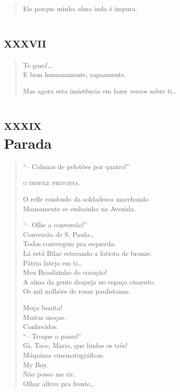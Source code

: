 {\begin{verse}
\quad{}Eis porque minha alma inda é impura.
\end{verse}

\chapter[«Te gozo!\ldots{}»]{\textsc{xxxvii}}

\begin{verse}
Te gozo!\ldots{}\\
E bem humanamente, rapazmente.

Mas agora esta insistência em fazer versos sobre ti\ldots{}
\end{verse}

\chapter[Parada]{\textsc{xxxix}\\Parada {}}

\begin{verse}
``-- Colunas de pelotões por quatro!''

\textsc{o desfile principia.}

O refle rombudo da soldadesca marchando\\
Mansamente se embainha na Avenida.

``-- Olhe a conversão!''\\
\qquad\quad Conversão de S. Paulo\ldots{}\\
Todos convergem pra esquerda.\\
Lá está Bilac estreando a fatiota de bronze.\\
\qquad\quad Pátria latejo em ti\ldots{}\\
\qquad Meu Brasilzinho do coração!\\
\quad A alma da gente drapeja no espaço cinzento.\\
Os mil milhões de rosas paulistanas.

Moça bonita!\\
Muitas moças.\\
Conhecidos.\\
``-- Troque o passo!''\\
Gi, Taco, Maria, que lindos os três!\\
Máquinas cinematográficas.\\
\qquad\qquad\qquad My Boy.\\
\qquad\qquad Não posso me rir.\\
Olhar altivo pra frente\ldots{}


\end{verse}}
